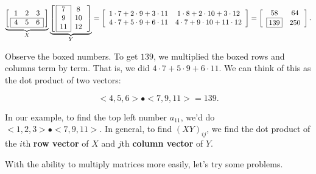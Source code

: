 \documentclass[../gatm.tex]{subfiles}
\begin{document}
\begin{center}
$$\underbrace{\left[\,\begin{array}{ccc}
1                      & 2 & 3                      \\ \hline
\multicolumn{1}{|l}{4} & 5 & \multicolumn{1}{l|}{6} \\ \hline
\end{array}\,\right]}_{X}\underbrace{\left[\,\begin{array}{|c|c}
\cline{1-1}
7  & 8  \\
9  & 10 \\
11 & 12 \\ \cline{1-1}
\end{array}\,\right]}_{Y}=\left[\begin{array}{cc}
1\cdot 7 + 2\cdot 9 + 3\cdot 11 & 1\cdot 8 + 2\cdot 10 + 3\cdot 12 \\
4\cdot 7 + 5\cdot 9 + 6\cdot 11 & 4\cdot 7 + 9\cdot 10 + 11\cdot 12 \\
\end{array}
\right]=\left[\begin{array}{cc}
58 & 64 \\
\boxed{139} & 250 \\
\end{array}\right].$$
\end{center}

\noindent Observe the boxed numbers. To get $139$, we multiplied the boxed rows and columns term by term. That is, we did $4\cdot 7 + 5\cdot 9 + 6\cdot 11$. We can think of this as the dot product of two vectors:

$${<} 4, 5, 6{>} \bullet {<} 7, 9, 11{>} = 139.$$

\noindent In our example, to find the top left number $a_{11}$, we'd do ${<}1,2,3{>} \bullet {<}7,9,11{>}$. In general, to find $(XY)_{ij}$, we find the dot product of the $i$th \textbf{row vector} of $X$ and $j$th \textbf{column vector} of $Y$.

With the ability to multiply matrices more easily, let's try some problems.
\end{document}
